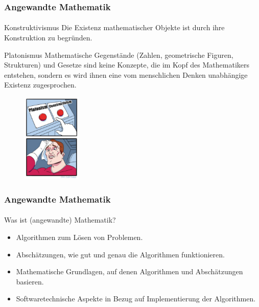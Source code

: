 \documentclass{beamer}
\begin{document}
\begin{frame}
    \frametitle{Angewandte Mathematik}
\framesubtitle{}
    \begin{block}{Konstruktivismus}
Die Existenz mathematischer Objekte ist durch ihre Konstruktion zu begründen. 
\end{block}
    \begin{block}{Platonismus}
Mathematische Gegenstände (Zahlen, geometrische Figuren, Strukturen) und Gesetze sind keine Konzepte, die im Kopf des Mathematikers entstehen, 
sondern es wird ihnen eine vom menschlichen Denken unabhängige Existenz zugesprochen.
\end{block}

\begin{figure}[H]
    \centering
  \includegraphics[width=0.25\textwidth]{images/hardchoice.png}
    \caption{}
\end{figure}
 \end{frame}


\begin{frame}
    \frametitle{Angewandte Mathematik}
\framesubtitle{}
    \begin{block}{Was ist (angewandte) Mathematik?}
\begin{itemize}
\item Algorithmen zum Lösen von Problemen.
 \item Abschätzungen, wie gut und genau die Algorithmen funktionieren.
 \item Mathematische Grundlagen, auf denen Algorithmen und Abschätzungen basieren. 
 \item Softwaretechnische Aspekte in Bezug auf  Implementierung der Algorithmen.
\end{itemize}
\end{block}
 \end{frame}
\end{document}
